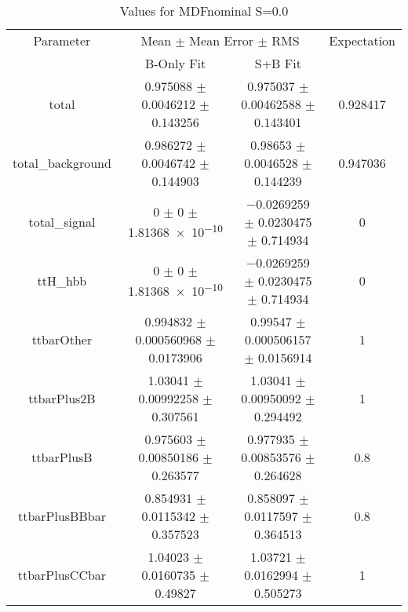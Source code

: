 \begin{table}
\centering
\caption{Values for MDFnominal S=0.0}
\begin{tabular}{cccc}
\toprule
Parameter & \multicolumn{2}{c}{Mean $\pm$ Mean Error $\pm$ RMS} & Expectation\\
 & B-Only Fit & S+B Fit & \\
\midrule
total & \num{0.975088} $\pm$ \num{0.0046212} $\pm$ \num{0.143256} & \num{0.975037} $\pm$ \num{0.00462588} $\pm$ \num{0.143401} & \num{0.928417}\\
total\_background & \num{0.986272} $\pm$ \num{0.0046742} $\pm$ \num{0.144903} & \num{0.98653} $\pm$ \num{0.0046528} $\pm$ \num{0.144239} & \num{0.947036}\\
total\_signal & \num{0} $\pm$ \num{0} $\pm$ \num{1.81368e-10} & \num{-0.0269259} $\pm$ \num{0.0230475} $\pm$ \num{0.714934} & \num{0}\\
ttH\_hbb & \num{0} $\pm$ \num{0} $\pm$ \num{1.81368e-10} & \num{-0.0269259} $\pm$ \num{0.0230475} $\pm$ \num{0.714934} & \num{0}\\
ttbarOther & \num{0.994832} $\pm$ \num{0.000560968} $\pm$ \num{0.0173906} & \num{0.99547} $\pm$ \num{0.000506157} $\pm$ \num{0.0156914} & \num{1}\\
ttbarPlus2B & \num{1.03041} $\pm$ \num{0.00992258} $\pm$ \num{0.307561} & \num{1.03041} $\pm$ \num{0.00950092} $\pm$ \num{0.294492} & \num{1}\\
ttbarPlusB & \num{0.975603} $\pm$ \num{0.00850186} $\pm$ \num{0.263577} & \num{0.977935} $\pm$ \num{0.00853576} $\pm$ \num{0.264628} & \num{0.8}\\
ttbarPlusBBbar & \num{0.854931} $\pm$ \num{0.0115342} $\pm$ \num{0.357523} & \num{0.858097} $\pm$ \num{0.0117597} $\pm$ \num{0.364513} & \num{0.8}\\
ttbarPlusCCbar & \num{1.04023} $\pm$ \num{0.0160735} $\pm$ \num{0.49827} & \num{1.03721} $\pm$ \num{0.0162994} $\pm$ \num{0.505273} & \num{1}\\
\bottomrule
\end{tabular}
\end{table}